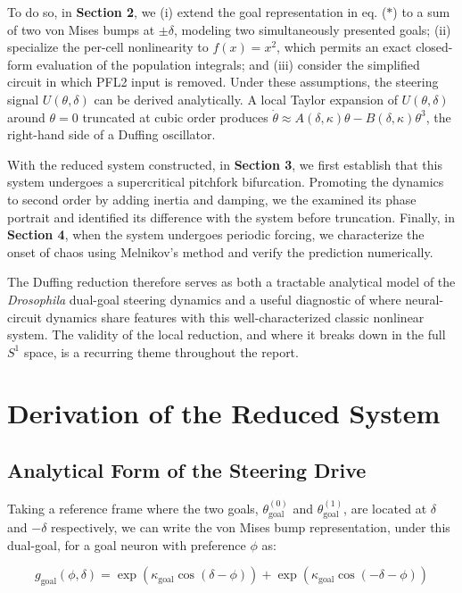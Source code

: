 \documentclass[11pt]{article}
\begin{document}
To do so, in \textbf{Section 2}, we (i) extend the goal representation in eq. ($*$) to a sum of two von Mises bumps at $\pm\delta$, modeling two simultaneously presented goals; (ii) specialize the per-cell nonlinearity to $f(x) = x^2$, which permits an exact closed-form evaluation of the population integrals; and (iii) consider the simplified circuit in which PFL2 input is removed. Under these assumptions, the steering signal $U(\theta, \delta)$ can be derived analytically. A local Taylor expansion of $U(\theta, \delta)$ around $\theta = 0$ truncated at cubic order produces $\dot\theta \approx A(\delta, \kappa)\theta - B(\delta, \kappa)\theta^3$, the right-hand side of a Duffing oscillator.

With the reduced system constructed, in \textbf{Section 3}, we first establish that this system undergoes a supercritical pitchfork bifurcation. Promoting the dynamics to second order by adding inertia and damping, we the examined its phase portrait and identified its difference with the system before truncation. Finally, in \textbf{Section 4}, when the system undergoes periodic forcing, we characterize the onset of chaos using Melnikov's method and verify the prediction numerically.

The Duffing reduction therefore serves as both a tractable analytical model of the \textit{Drosophila} dual-goal steering dynamics and a useful diagnostic of where neural-circuit dynamics share features with this well-characterized classic nonlinear system. The validity of the local reduction, and where it breaks down in the full $S^1$ space, is a recurring theme throughout the report.

\section{Derivation of the Reduced System}

\subsection{Analytical Form of the Steering Drive}

Taking a reference frame where the two goals, $\theta_{\text{goal}}^{(0)}$ and $\theta_{\text{goal}}^{(1)}$, are located at $\delta$ and $-\delta$ respectively, we can write the von Mises bump representation, under this dual-goal, for a goal neuron with preference $\phi$ as:

\begin{equation}
g_{\text{goal}}(\phi, \delta) = \exp(\kappa_{\text{goal}} \cos(\delta - \phi)) + \exp(\kappa_{\text{goal}} \cos(-\delta - \phi))
\end{equation}
\end{document}
